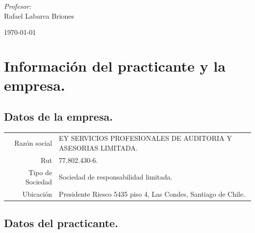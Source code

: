 \documentclass{article}
\begin{document}
\begin{titlepage}
\begin{center}
\vspace{1cm}

\noindent
\begin{minipage}{0.4\textwidth}
  \begin{flushleft} \large
  \end{flushleft}
\end{minipage}%
\begin{minipage}{0.4\textwidth}
  \begin{flushright} \large
    \emph{Profesor:} \\
   Rafael Labarca Briones
  \end{flushright}
\end{minipage}

\vfill

{\large \today}
\end{center}
\end{titlepage}


\tableofcontents
\newpage

\section{Información del practicante y la empresa.}
\subsection{Datos de la empresa.}

\begin{tabular}{r l}
    Razón social & EY SERVICIOS PROFESIONALES DE AUDITORIA Y ASESORIAS LIMITADA.\\
    Rut & 77.802.430-6.\\
	Tipo de Sociedad & Sociedad de responsabilidad limitada.\\
	Ubicación & Presidente Riesco 5435 piso 4, Las Condes, Santiago de Chile.\\

\end{tabular}

\subsection{Datos del practicante.}
\end{document}
